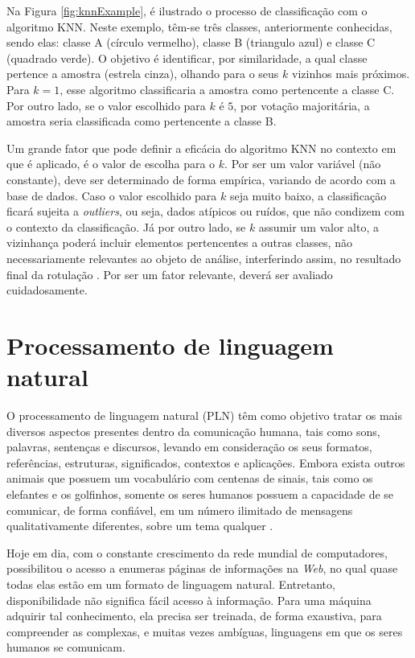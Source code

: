 Na Figura \ref{fig:knnExample}, é ilustrado o processo de classificação com o algoritmo KNN. Neste exemplo, têm-se três classes, anteriormente conhecidas, sendo elas: classe A (círculo vermelho), classe B (triangulo azul) e classe C (quadrado verde). O objetivo é identificar, por similaridade, a qual classe pertence a amostra (estrela cinza), olhando para o seus $k$ vizinhos mais próximos. Para $k = 1$, esse algoritmo classificaria a amostra como pertencente a classe C. Por outro lado, se o valor escolhido para $k$ é $5$, por votação majoritária, a amostra seria classificada como pertencente a classe B.

Um grande fator que pode definir a eficácia do algoritmo KNN no contexto em que é aplicado, é o valor de escolha para o $k$. Por ser um valor variável (não constante), deve ser determinado de forma empírica, variando de acordo com a base de dados. Caso o valor escolhido para $k$ seja muito baixo, a classificação ficará sujeita a \textit{outliers}, ou seja, dados atípicos ou ruídos, que não condizem com o contexto da classificação. Já por outro lado, se $k$ assumir um valor alto, a vizinhança poderá incluir elementos pertencentes a outras classes, não necessariamente relevantes ao objeto de análise, interferindo assim, no resultado final da rotulação \citep{fukunaga1975knn}. Por ser um fator relevante, deverá ser avaliado cuidadosamente.

\section{Processamento de linguagem natural}
O processamento de linguagem natural (PLN) têm como objetivo tratar os mais diversos aspectos presentes dentro da comunicação humana, tais como sons, palavras, sentenças e discursos, levando em consideração os seus formatos, referências, estruturas, significados, contextos e aplicações. Embora exista outros animais que possuem um vocabulário com centenas de sinais, tais como os elefantes e os golfinhos, somente os seres humanos possuem a capacidade de se comunicar, de forma confiável, em um número ilimitado de mensagens qualitativamente diferentes, sobre um tema qualquer \citep{russell1994inteligencia, gonzalez2003recuperaccao}.

Hoje em dia, com o constante crescimento da rede mundial de computadores, possibilitou o acesso a enumeras páginas de informações na \textit{Web}, no qual quase todas elas estão em um formato de linguagem natural. Entretanto, disponibilidade não significa fácil acesso à informação. Para uma máquina adquirir tal conhecimento, ela precisa ser treinada, de forma exaustiva, para compreender as complexas, e muitas vezes ambíguas, linguagens em que os seres humanos se comunicam.

